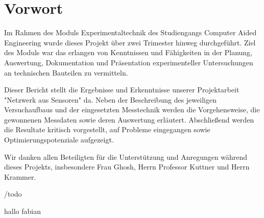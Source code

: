 
\chapter*{Vorwort}
\thispagestyle{empty} %
\todo{}

Im Rahmen des Moduls Experimentaltechnik des Studiengangs Computer Aided Engineering wurde dieses Projekt über zwei Trimester hinweg durchgeführt.
Ziel des Moduls war das erlangen von Kenntnissen und Fähigkeiten in der Planung, Auswertung, Dokumentation und Präsentation experimenteller Untersuchungen an technischen Bauteilen zu vermitteln.

Dieser Bericht stellt die Ergebnisse und Erkenntnisse unserer Projektarbeit "Netzwerk aus Sensoren" da. Neben der Beschreibung des jeweiligen Versuchaufbaus und der eingesetzten Messtechnik  werden die Vorgehensweise, die gewonnenen Messdaten sowie deren Auswertung erläutert. Abschließend werden die Resultate kritisch vorgestellt, auf Probleme eingegangen sowie Optimierungspotenziale aufgezeigt.

Wir danken allen Beteiligten für die Unterstützung und Anregungen während dieses Projekts, insbesondere Frau Ghosh, Herrn Professor Kuttner und Herrn Krammer.



/todo{}

hallo fabian